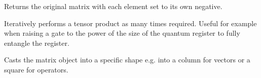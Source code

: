\documentclass[letterpaper,10pt,english]{sphinxmanual}
\begin{document}
\begin{fulllineitems}
\begin{fulllineitems}
\label{\detokenize{index:utils.matrixInterface.matrixInterface.negate}}
\pysigstartsignatures
{}
\pysigstopsignatures
\sphinxAtStartPar
Returns the original matrix with each element set to its own negative.

\end{fulllineitems}


\begin{fulllineitems}
\label{\detokenize{index:utils.matrixInterface.matrixInterface.power}}
\pysigstartsignatures
{}
\pysigstopsignatures
\sphinxAtStartPar
Iteratively performs a tensor product as many times required. Useful for example when raising a
gate to the power of the size of the quantum register to fully entangle the register.

\end{fulllineitems}


\begin{fulllineitems}
\label{\detokenize{index:utils.matrixInterface.matrixInterface.reshape}}
\pysigstartsignatures
{}
\pysigstopsignatures
\sphinxAtStartPar
Casts the matrix object into a specific shape e.g. into a column for vectors or
a square for operators.


\end{fulllineitems}
\end{fulllineitems}
\end{document}
